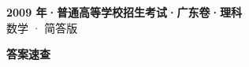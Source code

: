\documentclass[zihao=-4, a4paper]{ctexart}
\begin{document}
\begin{center}
  {\Large\bfseries 2009 年·普通高等学校招生考试·广东卷·理科}\\[4pt]
  {\large 数学 · 简答版}
\end{center}
\medskip
{}

\clearpage
{}
\begin{center}{\Large\bfseries 答案速查}\end{center}
\medskip

\end{document}
